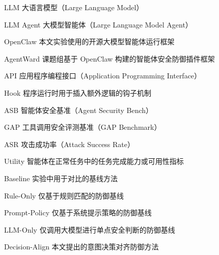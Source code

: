 
\begin{denotation}[3cm]
  \item[LLM] 大语言模型（Large Language Model）
  \item[LLM Agent] 大模型智能体（Large Language Model Agent）
  \item[OpenClaw] 本文实验使用的开源大模型智能体运行框架
  \item[AgentWard] 课题组基于 OpenClaw 构建的智能体安全防御插件框架
  \item[API] 应用程序编程接口（Application Programming Interface）
  \item[Hook] 程序运行时用于插入额外逻辑的钩子机制
  \item[ASB] 智能体安全基准（Agent Security Bench）
  \item[GAP] 工具调用安全评测基准（GAP Benchmark）
  \item[ASR] 攻击成功率（Attack Success Rate）
  \item[Utility] 智能体在正常任务中的任务完成能力或可用性指标
  \item[Baseline] 实验中用于对比的基线方法
  \item[Rule-Only] 仅基于规则匹配的防御基线
  \item[Prompt-Policy] 仅基于系统提示策略的防御基线
  \item[LLM-Only] 仅调用大模型进行单点安全判断的防御基线
  \item[Decision-Align] 本文提出的意图决策对齐防御方法
\end{denotation}
